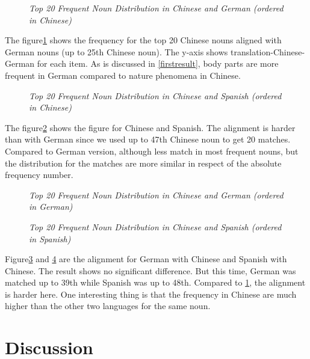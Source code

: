 \begin{figure}[t]
\centerline{}
\caption{{\it Top 20 Frequent Noun Distribution in Chinese and German (ordered in Chinese)}}
\label{fig1}
\end{figure}

The figure\ref{fig1} shows the frequency for the top 20 Chinese nouns aligned with German nouns (up to 25th Chinese noun). The y-axis shows translation-Chinese-German for each item. As is discussed in \ref{firstresult}, body parts are more frequent in German compared to nature phenomena in Chinese. 

\begin{figure}[t]
\centerline{}
\caption{{\it Top 20 Frequent Noun Distribution in Chinese and Spanish (ordered in Chinese)}}
\label{fig2}
\end{figure}

The figure\ref{fig2} shows the figure for Chinese and Spanish. The alignment is harder than with German since we used up to 47th Chinese noun to get 20 matches. Compared to German version, although less match in most frequent nouns, but the distribution for the matches are more similar in respect of the absolute frequency number. 

\begin{figure}[t]
\centerline{}
\caption{{\it Top 20 Frequent Noun Distribution in Chinese and German (ordered in German)}}
\label{fig3}
\end{figure}

\begin{figure}[t]
\centerline{}
\caption{{\it Top 20 Frequent Noun Distribution in Chinese and Spanish (ordered in Spanish)}}
\label{fig4}
\end{figure}

Figure\ref{fig3} and \ref{fig4} are the alignment for German with Chinese and Spanish with Chinese. The result shows no significant difference. But this time, German was matched up to 39th while Spanish was up to 48th. Compared to \ref{fig1}, the alignment is harder here. One interesting thing is that the frequency in Chinese are much higher than the other two languages for the same noun. 




\section{Discussion}

